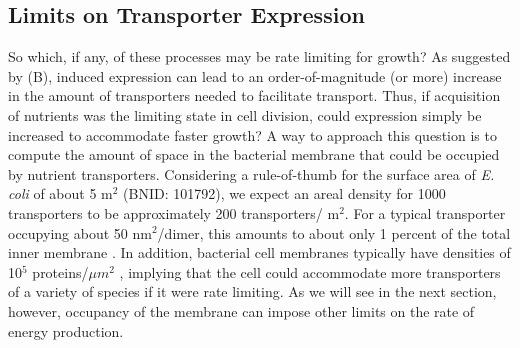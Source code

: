 \subsection{Limits on Transporter Expression}
So which, if any, of these processes may be rate limiting for growth? As
suggested by  (B), induced expression can lead to an
order-of-magnitude (or more) increase in the amount of transporters needed to
facilitate transport. Thus, if acquisition of nutrients was the limiting state
in cell division, could expression simply be increased to accommodate faster
growth? A way to approach this question is to compute the amount of space in the
bacterial membrane that could be occupied by nutrient transporters. Considering a rule-of-thumb for the surface area of
\textit{E. coli} of about 5 \textmu m$^2$ (BNID: 101792), we expect
an areal density for 1000 transporters to be approximately 200
transporters/ \textmu m$^2$. For a typical transporter occupying about 50
nm$^2$/dimer, this amounts to about only 1 percent of the total inner membrane
\citep{szenk2017}. In addition, bacterial cell membranes typically have
densities of 10$^5$ proteins/$\mu m^2$ \citep{phillips2018}, implying that the
cell could accommodate more transporters of a variety of species if it were rate
limiting. As we will see in the next section, however, occupancy of the membrane can
impose other limits on the rate of energy production.
